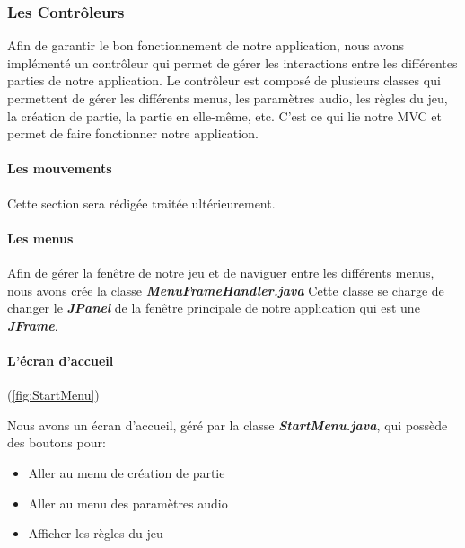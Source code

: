 \subsubsection{Les Contrôleurs}
\label{subsubsec:controleur}

Afin de garantir le bon fonctionnement de notre application, nous avons implémenté un contrôleur qui permet de gérer les interactions entre les différentes parties de notre application. Le contrôleur est composé de plusieurs classes qui permettent de gérer les différents menus, les paramètres audio, les règles du jeu, la création de partie, la partie en elle-même, etc. C'est ce qui lie notre MVC et permet de faire fonctionner notre application.

\paragraph{Les mouvements}

Cette section sera rédigée traitée ultérieurement.

\paragraph{Les menus}

Afin de gérer la fenêtre de notre jeu et de naviguer entre les différents menus, nous avons crée la classe \textbf{\textit{MenuFrameHandler.java}} Cette classe se charge de changer le \textbf{\textit{JPanel}} de la fenêtre principale de notre application qui est une \textbf{\textit{JFrame}}.

\paragraph{L'écran d'accueil} (\ref{fig:StartMenu})

Nous avons un écran d'accueil, géré par la classe \textbf{\textit{StartMenu.java}}, qui possède des boutons pour:

\begin{itemize}
    \item Aller au menu de création de partie
    \item Aller au menu des paramètres audio
    \item Afficher les règles du jeu
\end{itemize}

